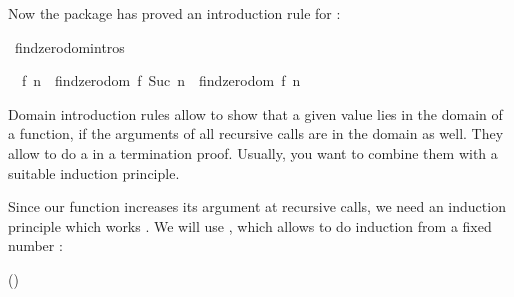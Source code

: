 \begin{isabellebody}
\begin{isamarkuptext}
  \noindent Now the package has proved an introduction rule for :%
\end{isamarkuptext}%
\isamarkuptrue%
\isamarkupfalse%
\ findzero{}domintros%
\begin{isamarkuptext}%
\begin{isabelle}%
{}{}\ {}\ {}f\ {}n\ {}\ findzero{}dom\ {}{}f{}\ Suc\ {}n{}{}\ {}\ findzero{}dom\ {}{}f{}\ {}n{}%
\end{isabelle}

  Domain introduction rules allow to show that a given value lies in the
  domain of a function, if the arguments of all recursive calls
  are in the domain as well. They allow to do a  in a
  termination proof. Usually, you want to combine them with a suitable
  induction principle.

  Since our function increases its argument at recursive calls, we
  need an induction principle which works . We will use
  , which allows to do induction from a fixed number
  :

  \begin{center}\hfill()\end{center}


\end{isamarkuptext}
\end{isabellebody}
